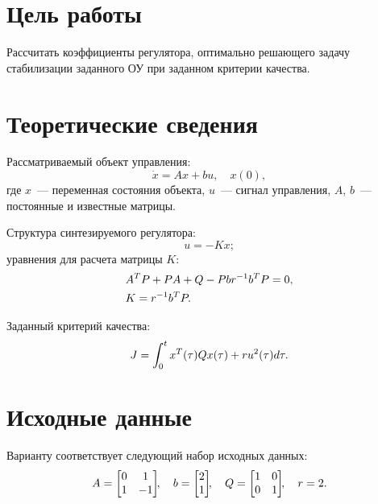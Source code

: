 \section{Цель работы}
Рассчитать коэффициенты регулятора, оптимально решающего задачу стабилизации заданного ОУ при заданном критерии качества.



\section{Теоретические сведения}
Рассматриваемый объект управления:
\begin{equation}
    \dot{x} = A x + b u, \quad x(0),
\end{equation}
где $x$~--- переменная состояния объекта, $u$~--- сигнал управления, $A$, $b$~--- постоянные и известные матрицы.

Структура синтезируемого регулятора:
\begin{equation}\label{eq_tuned_controller}
    u = -K x;
\end{equation}
уравнения для расчета матрицы $K$:
\begin{align}
    & A^T P + P A + Q - P b r^{-1} b^T P = 0, \label{eq_riccati_equation}\\
    & K = r^{-1} b^T P \label{eq_K_equation} \ldotp
\end{align}

Заданный критерий качества:
\begin{equation}
    J = \int_0^t x^T(\tau) Q x(\tau) + r u^2(\tau) d\tau \ldotp
\end{equation}



\section{Исходные данные}
Варианту  соответствует следующий набор исходных данных:
\begin{equation}
    A =
    \begin{bmatrix}
        0 &  1 \\
        1 & -1
    \end{bmatrix}\!\!,
    \quad
    b =
    \begin{bmatrix}
        2 \\ 1
    \end{bmatrix}\!\!,
    \quad
    Q =
    \begin{bmatrix}
        1 & 0 \\
        0 & 1
    \end{bmatrix}\!\!,
    \quad
    r = 2 \ldotp
\end{equation}



